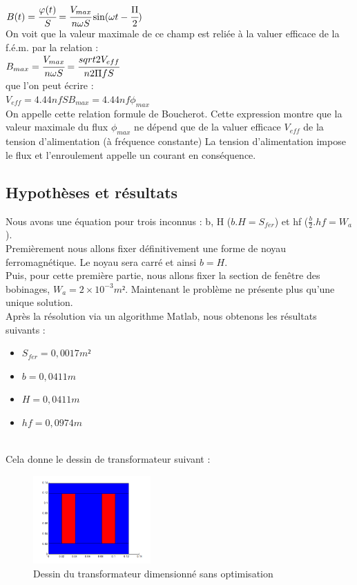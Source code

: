 $B(t) =  \cfrac{\varphi(t)}{S} = \cfrac{V_{max}}{n\omega S}\sin(\omega{}t - \cfrac{\Pi}{2})$\\


On voit que la valeur maximale de ce champ est reliée à la valuer efficace de la f.é.m. par la relation :\\

$B_{max} =  \cfrac{V_{max}}{n\omega S} = \cfrac{sqrt{2}V_{eff}}{n 2\Pi f S}$ \\

que l'on peut écrire : \\

$V_{eff} = 4.44 n f S B_{max} = 4.44 n f \phi_{max}$\\


On appelle cette relation formule de Boucherot. Cette expression montre que la valeur maximale du flux $\phi_{max}$ ne dépend que de la valuer efficace $V_{eff} $ de la tension d'alimentation (à fréquence constante) La tension d'alimentation impose le flux et l'enroulement appelle un courant en conséquence. 

	
\subsection{Hypothèses et résultats}
Nous avons une équation pour trois inconnus : b, H ($b.H = S_{fer}$) et hf ($\frac{b}{2}.hf = W_a$).\\
Premièrement nous allons fixer définitivement une forme de noyau ferromagnétique. Le noyau sera carré et ainsi $b = H$.\\
Puis, pour cette première partie, nous allons fixer la section de fenêtre des bobinages, $W_a = 2\times{}10^{-3} m²$.
Maintenant le problème ne présente plus qu'une unique solution.\\

\newpage
Après la résolution via un algorithme Matlab, nous obtenons les résultats suivants : \\
\begin{itemize}
\item $S_{fer} = 0,0017 m² $
\item $b = 0,0411 m $
\item $H = 0,0411 m $
\item $hf = 0,0974 m $
\end{itemize}~\\

Cela donne le dessin de transformateur suivant :
\begin{figure}[h]
	\begin{center}
	\includegraphics[width=0.4\textwidth]{images/TP1_transfo_carre}
	\caption{Dessin du transformateur dimensionné sans optimisation}\label{img:dessinTransfoCarre}
	\end{center}
\end{figure}
\FloatBarrier 

